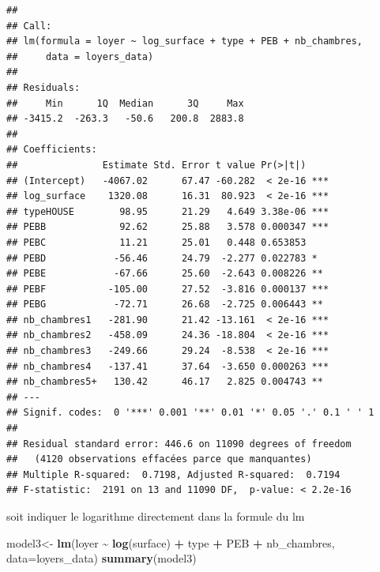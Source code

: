 \documentclass[
]{book}
\newenvironment{Shaded}{\begin{snugshade}}{\end{snugshade}}
\newcommand{\AttributeTok}[1]{\textcolor[rgb]{0.13,0.29,0.53}{#1}}
\newcommand{\FunctionTok}[1]{\textcolor[rgb]{0.13,0.29,0.53}{\textbf{#1}}}
\newcommand{\NormalTok}[1]{#1}
\newcommand{\OtherTok}[1]{\textcolor[rgb]{0.56,0.35,0.01}{#1}}
\newcommand{\SpecialCharTok}[1]{\textcolor[rgb]{0.81,0.36,0.00}{\textbf{#1}}}
\begin{document}
\begin{verbatim}
## 
## Call:
## lm(formula = loyer ~ log_surface + type + PEB + nb_chambres, 
##     data = loyers_data)
## 
## Residuals:
##     Min      1Q  Median      3Q     Max 
## -3415.2  -263.3   -50.6   200.8  2883.8 
## 
## Coefficients:
##               Estimate Std. Error t value Pr(>|t|)    
## (Intercept)   -4067.02      67.47 -60.282  < 2e-16 ***
## log_surface    1320.08      16.31  80.923  < 2e-16 ***
## typeHOUSE        98.95      21.29   4.649 3.38e-06 ***
## PEBB             92.62      25.88   3.578 0.000347 ***
## PEBC             11.21      25.01   0.448 0.653853    
## PEBD            -56.46      24.79  -2.277 0.022783 *  
## PEBE            -67.66      25.60  -2.643 0.008226 ** 
## PEBF           -105.00      27.52  -3.816 0.000137 ***
## PEBG            -72.71      26.68  -2.725 0.006443 ** 
## nb_chambres1   -281.90      21.42 -13.161  < 2e-16 ***
## nb_chambres2   -458.09      24.36 -18.804  < 2e-16 ***
## nb_chambres3   -249.66      29.24  -8.538  < 2e-16 ***
## nb_chambres4   -137.41      37.64  -3.650 0.000263 ***
## nb_chambres5+   130.42      46.17   2.825 0.004743 ** 
## ---
## Signif. codes:  0 '***' 0.001 '**' 0.01 '*' 0.05 '.' 0.1 ' ' 1
## 
## Residual standard error: 446.6 on 11090 degrees of freedom
##   (4120 observations effacées parce que manquantes)
## Multiple R-squared:  0.7198, Adjusted R-squared:  0.7194 
## F-statistic:  2191 on 13 and 11090 DF,  p-value: < 2.2e-16
\end{verbatim}

soit indiquer le logarithme directement dans la formule du lm

\begin{Shaded}
\begin{Highlighting}[]
\NormalTok{model3}\OtherTok{\textless{}{-}} \FunctionTok{lm}\NormalTok{(loyer }\SpecialCharTok{\textasciitilde{}} \FunctionTok{log}\NormalTok{(surface) }\SpecialCharTok{+}\NormalTok{  type }\SpecialCharTok{+}\NormalTok{ PEB }\SpecialCharTok{+}\NormalTok{ nb\_chambres, }\AttributeTok{data=}\NormalTok{loyers\_data)}
\FunctionTok{summary}\NormalTok{(model3)}
\end{Highlighting}
\end{Shaded}
\end{document}
